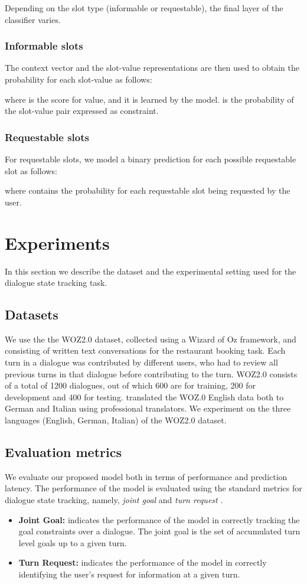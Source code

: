 \documentclass{article}
\begin{document}
Depending on the slot type (informable or requestable), the final layer of the classifier varies.

\subsubsection{Informable slots}
The context vector  and the slot-value representations  are then used to obtain the probability for each slot-value as follows:

where  is the score for  value, and it is learned by the model.  is the probability of the slot-value pair expressed as constraint.

\subsubsection{Requestable slots}
For requestable slots, we model a binary prediction for each possible requestable slot as follows:


where  contains the probability for each requestable slot being requested by the user.

\section{Experiments}
\label{sec:exp}
In this section we describe the dataset and the experimental setting used for the dialogue state tracking task.

\subsection{Datasets}
We use the the WOZ2.0 \cite{NBT} dataset, collected using a Wizard of Oz framework, and consisting of written text conversations for the restaurant booking task.
Each turn in a dialogue was contributed by different users, who had to review all previous turns in that dialogue before contributing to the turn.
WOZ2.0 consists of a total of 1200 dialogues, out of which 600 are for training, 200 for development and 400 for testing.
\cite{mrksicsemantic} translated the WOZ.0 English data both to German and Italian using professional translators.
We experiment on the three languages (English, German, Italian) of the WOZ2.0 dataset.

\subsection{Evaluation metrics}
We evaluate our proposed model both in terms of performance and prediction latency.
The performance of the model is evaluated using the standard metrics for dialogue state tracking, namely, \textit{joint goal} and \textit{turn request} \cite{DSTC2}.
\begin{itemize}
    \item \textbf{Joint Goal:} indicates the performance of the model in correctly tracking the goal constraints over a dialogue. The joint goal is the set of accumulated turn level goals up to a given turn.
    \item \textbf{Turn Request:} indicates the performance of the model in correctly identifying the user's request for information at a given turn.
\end{itemize}
\end{document}
